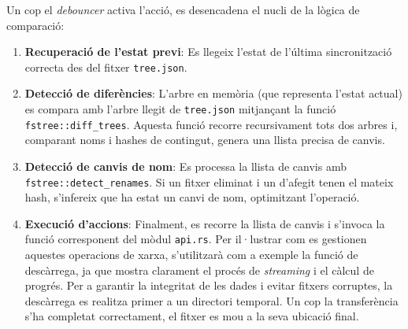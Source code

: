 Un cop el \textit{debouncer} activa l'acció, es desencadena el nucli de la lògica de comparació:
\begin{enumerate}
    \item \textbf{Recuperació de l'estat previ}: Es llegeix l'estat de l'última sincronització correcta des del fitxer \texttt{tree.json}.
    \item \textbf{Detecció de diferències}: L'arbre en memòria (que representa l'estat actual) es compara amb l'arbre llegit de \texttt{tree.json} mitjançant la funció \texttt{fstree::diff\_trees}. Aquesta funció recorre recursivament tots dos arbres i, comparant noms i hashes de contingut, genera una llista precisa de canvis.
    \item \textbf{Detecció de canvis de nom}: Es processa la llista de canvis amb \texttt{fstree::detect\_renames}. Si un fitxer eliminat i un d'afegit tenen el mateix hash, s'infereix que ha estat un canvi de nom, optimitzant l'operació.
    \item \textbf{Execució d'accions}: Finalment, es recorre la llista de canvis i s'invoca la funció corresponent del mòdul \texttt{api.rs}. Per il·lustrar com es gestionen aquestes operacions de xarxa, s'utilitzarà com a exemple la funció de descàrrega, ja que mostra clarament el procés de \textit{streaming} i el càlcul de progrés. Per a garantir la integritat de les dades i evitar fitxers corruptes, la descàrrega es realitza primer a un directori temporal. Un cop la transferència s'ha completat correctament, el fitxer es mou a la seva ubicació final.
\end{enumerate}

